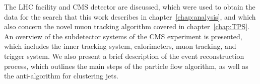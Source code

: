 The LHC facility and CMS detector are discussed, which were used to obtain the data for the search that this work describes in chapter~\ref{chap:analysis}, and which also concern the novel muon tracking algorithm covered in chapter~\ref{chap:TPS}.
An overview of the subdetector systems of the CMS experiment is presented, which includes the inner tracking system, calorimeters, muon tracking, and trigger system.
We also present a brief description of the event reconstruction process, which outlines the main steps of the particle flow algorithm, as well as the anti-\kt algorithm for clustering jets.
